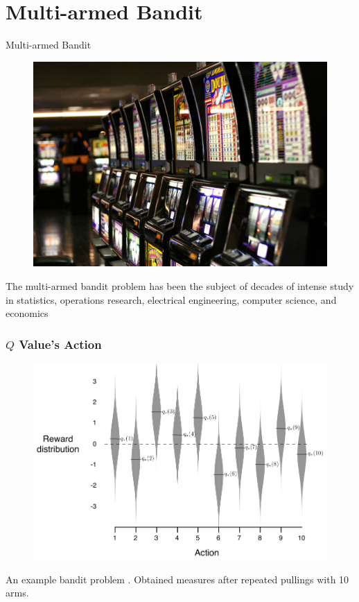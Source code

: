 \documentclass[10pt]{beamer}
\begin{document}
\section{Multi-armed Bandit}
\begin{frame}{Multi-armed Bandit}
	\begin{figure}[t!]	
	\centering
	\includegraphics[scale=0.2]{img/Las_Vegas_slot_machines.jpg}
	\end{figure}
	The multi-armed bandit problem has been the subject of decades of intense study in statistics, operations research, electrical engineering, computer science, and economics \cite{bandit}
\end{frame}

\begin{frame}
	\frametitle{\begin{math} Q \end{math} Value's Action}
	\begin{figure}[t!]
		\centering
		\includegraphics[scale=0.25]{img/bandit-reward-dist.png}
	\end{figure}
	An example bandit problem \cite{Montague1999}. Obtained measures after repeated pullings with 10 arms.
\end{frame}
\end{document}
